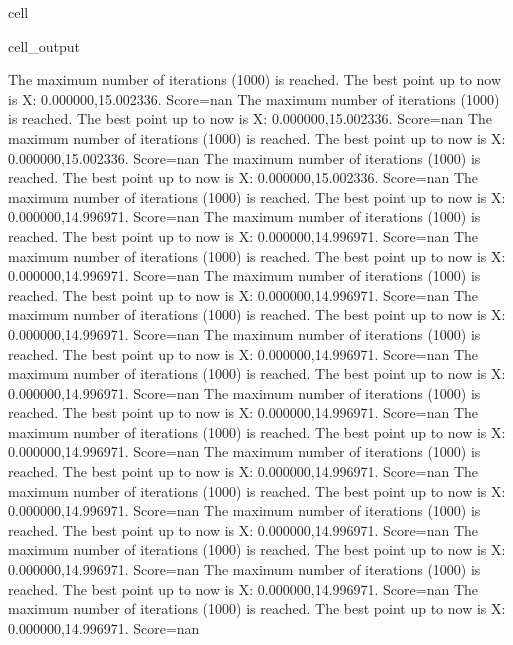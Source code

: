 \documentclass[letterpaper,10pt,english]{jupyterBook}
\begin{document}
\begin{sphinxuseclass}{cell}
\begin{sphinxVerbatimOutput}
\begin{sphinxuseclass}{cell_output}
\begin{sphinxVerbatim}[commandchars=\\\{\}]
The maximum number of iterations (1000) is reached. The best point up to now is X: \PYGZob{}0.000000,15.002336\PYGZcb{}. Score=\PYGZhy{}nan
The maximum number of iterations (1000) is reached. The best point up to now is X: \PYGZob{}0.000000,15.002336\PYGZcb{}. Score=\PYGZhy{}nan
The maximum number of iterations (1000) is reached. The best point up to now is X: \PYGZob{}0.000000,15.002336\PYGZcb{}. Score=\PYGZhy{}nan
The maximum number of iterations (1000) is reached. The best point up to now is X: \PYGZob{}0.000000,15.002336\PYGZcb{}. Score=\PYGZhy{}nan
The maximum number of iterations (1000) is reached. The best point up to now is X: \PYGZob{}0.000000,14.996971\PYGZcb{}. Score=\PYGZhy{}nan
The maximum number of iterations (1000) is reached. The best point up to now is X: \PYGZob{}0.000000,14.996971\PYGZcb{}. Score=\PYGZhy{}nan
The maximum number of iterations (1000) is reached. The best point up to now is X: \PYGZob{}0.000000,14.996971\PYGZcb{}. Score=\PYGZhy{}nan
The maximum number of iterations (1000) is reached. The best point up to now is X: \PYGZob{}0.000000,14.996971\PYGZcb{}. Score=\PYGZhy{}nan
The maximum number of iterations (1000) is reached. The best point up to now is X: \PYGZob{}0.000000,14.996971\PYGZcb{}. Score=\PYGZhy{}nan
The maximum number of iterations (1000) is reached. The best point up to now is X: \PYGZob{}0.000000,14.996971\PYGZcb{}. Score=\PYGZhy{}nan
The maximum number of iterations (1000) is reached. The best point up to now is X: \PYGZob{}0.000000,14.996971\PYGZcb{}. Score=\PYGZhy{}nan
The maximum number of iterations (1000) is reached. The best point up to now is X: \PYGZob{}0.000000,14.996971\PYGZcb{}. Score=\PYGZhy{}nan
The maximum number of iterations (1000) is reached. The best point up to now is X: \PYGZob{}0.000000,14.996971\PYGZcb{}. Score=\PYGZhy{}nan
The maximum number of iterations (1000) is reached. The best point up to now is X: \PYGZob{}0.000000,14.996971\PYGZcb{}. Score=\PYGZhy{}nan
The maximum number of iterations (1000) is reached. The best point up to now is X: \PYGZob{}0.000000,14.996971\PYGZcb{}. Score=\PYGZhy{}nan
The maximum number of iterations (1000) is reached. The best point up to now is X: \PYGZob{}0.000000,14.996971\PYGZcb{}. Score=\PYGZhy{}nan
The maximum number of iterations (1000) is reached. The best point up to now is X: \PYGZob{}0.000000,14.996971\PYGZcb{}. Score=\PYGZhy{}nan
The maximum number of iterations (1000) is reached. The best point up to now is X: \PYGZob{}0.000000,14.996971\PYGZcb{}. Score=\PYGZhy{}nan
The maximum number of iterations (1000) is reached. The best point up to now is X: \PYGZob{}0.000000,14.996971\PYGZcb{}. Score=\PYGZhy{}nan

\end{sphinxVerbatim}
\end{sphinxuseclass}
\end{sphinxVerbatimOutput}
\end{sphinxuseclass}
\end{document}
